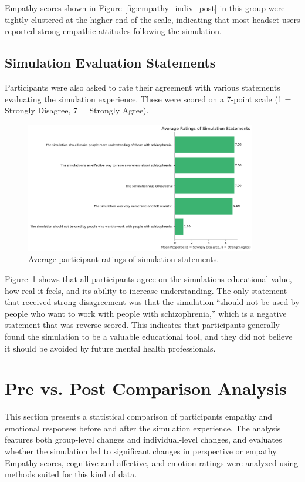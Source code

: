 \vspace{1em}

Empathy scores shown in Figure \ref{fig:empathy_indiv_post} in this group were tightly clustered at the higher end of the scale, indicating that most headset users reported strong empathic attitudes following the simulation.

\subsection{Simulation Evaluation Statements}

Participants were also asked to rate their agreement with various statements evaluating the simulation experience. These were scored on a 7-point scale (1 = Strongly Disagree, 7 = Strongly Agree).

\begin{figure}[H]
    \centering
    \includegraphics[width=0.9\textwidth]{../../Figures/simulation-evaluation-post.png}
    \caption{Average participant ratings of simulation statements.}
    \label{fig:simulation_evaluation_post}
\end{figure}

Figure~\ref{fig:simulation_evaluation_post} shows that all participants agree on the simulations educational value, how real it feels, and its ability to increase understanding. The only statement that received strong disagreement was that the simulation “should not be used by people who want to work with people with schizophrenia,” which is a negative statement that was reverse scored. This indicates that participants generally found the simulation to be a valuable educational tool, and they did not believe it should be avoided by future mental health professionals.

\section{Pre vs. Post Comparison Analysis}
\label{sec:pre_post_comparison}
This section presents a statistical comparison of participants empathy and emotional responses before and after the simulation experience. The analysis features both group-level changes and individual-level changes, and evaluates whether the simulation led to significant changes in perspective or empathy. Empathy scores, cognitive and affective, and emotion ratings were analyzed using methods suited for this kind of data.

